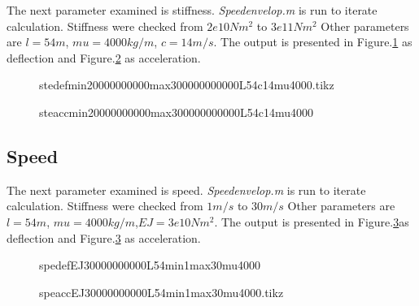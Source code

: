 The next parameter examined is stiffness. \textit{Speedenvelop.m} is run to iterate calculation. Stiffness were checked from $2e10 Nm^2$ to $3e11 Nm^2$ Other parameters are $l=54m$, $mu=4000kg/m$, $c=14m/s$. The output is presented in Figure.\ref{fig:stedefmin20000000000max300000000000L54c14mu4000} as deflection and Figure.\ref{fig:steaccmin20000000000max300000000000L54c14mu4000} as acceleration.

\begin{figure}[h!]
\centering 
\setlength\figureheight{6cm} 
\setlength\figurewidth{6cm} 
 
\caption{stedefmin20000000000max300000000000L54c14mu4000.tikz} 
\label{fig:stedefmin20000000000max300000000000L54c14mu4000} 
\end{figure}


\begin{figure}[h!]
\centering 
\setlength\figureheight{6cm} 
\setlength\figurewidth{6cm} 
 
\caption{steaccmin20000000000max300000000000L54c14mu4000} 
\label{fig:steaccmin20000000000max300000000000L54c14mu4000} 
\end{figure}

\subsection{Speed}

The next parameter examined is speed. \textit{Speedenvelop.m} is run to iterate calculation. Stiffness were checked from $1m/s$ to $30m/s$ Other parameters are $l=54m$, $mu=4000kg/m$,$EJ = 3e10 Nm^2$. The output is presented in Figure.\ref{fig:spedefEJ30000000000L54min1max30mu4000.tikz}as deflection and Figure.\ref{fig:spedefEJ30000000000L54min1max30mu4000.tikz} as acceleration.

\begin{figure}[h!]
\centering 
\setlength\figureheight{6cm} 
\setlength\figurewidth{6cm} 
 
\caption{spedefEJ30000000000L54min1max30mu4000} 
\label{fig:spedefEJ30000000000L54min1max30mu4000.tikz} 
\end{figure}


\begin{figure}[h!]
\centering 
\setlength\figureheight{6cm} 
\setlength\figurewidth{6cm} 
 
\caption{speaccEJ30000000000L54min1max30mu4000.tikz} 
\label{fig:speaccEJ30000000000L54min1max30mu4000} 
\end{figure}

